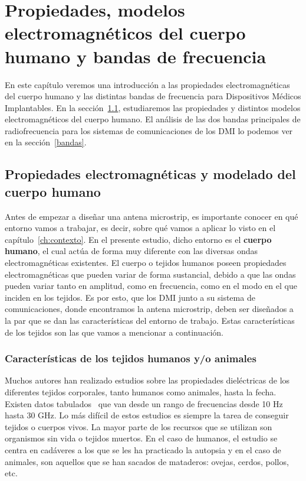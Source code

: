\chapter{\textbf{Propiedades, modelos electromagnéticos del cuerpo humano y bandas de frecuencia}}\label{ch:cap3}

En este capítulo veremos una introducción a las propiedades electromagnéticas del cuerpo humano y las distintas bandas de frecuencia para Dispositivos Médicos Implantables. En la sección~\ref{sec:propiedades}, estudiaremos las propiedades y distintos modelos electromagnéticos del cuerpo humano. El análisis de las dos bandas principales de radiofrecuencia para los sistemas de comunicaciones de los DMI lo podemos ver en la sección~\ref{bandas}.


\section{Propiedades electromagnéticas y modelado del cuerpo humano}\label{sec:propiedades}

Antes de empezar a diseñar una antena microstrip, es importante conocer en qué entorno vamos a trabajar, es decir, sobre qué vamos a aplicar lo visto en el capítulo~\ref{ch:contexto}. En el presente estudio, dicho entorno es el \textbf{cuerpo humano}, el cual actúa de forma muy diferente con las diversas ondas electromagnéticas existentes. El cuerpo o tejidos humanos poseen propiedades electromagnéticas que pueden variar de forma sustancial, debido a que las ondas pueden variar tanto en amplitud, como en frecuencia, como en el modo en el que inciden en los tejidos. Es por esto, que los DMI junto a su sistema de comunicaciones, donde encontramos la antena microstrip, deben ser diseñados a la par que se dan las características del entorno de trabajo. Estas características de los tejidos son las que vamos a mencionar a continuación.

\subsection{Características de los tejidos humanos y/o animales}\label{subsec:caracteristicas-de-los-tejidos-humanos-y/o-animales}

Muchos autores han realizado estudios sobre las propiedades dieléctricas de los diferentes tejidos corporales, tanto humanos como animales, hasta la fecha. Existen datos tabulados~\cite{durney,geddes,stuchly} que van desde un rango de frecuencias desde 10 Hz hasta 30 GHz. Lo más difícil de estos estudios es siempre la tarea de conseguir tejidos o cuerpos vivos. La mayor parte de los recursos que se utilizan son organismos sin vida o tejidos muertos. En el caso de humanos, el estudio se centra en cadáveres a los que se les ha practicado la autopsia y en el caso de animales, son aquellos que se han sacados de mataderos: ovejas, cerdos, pollos, etc.

